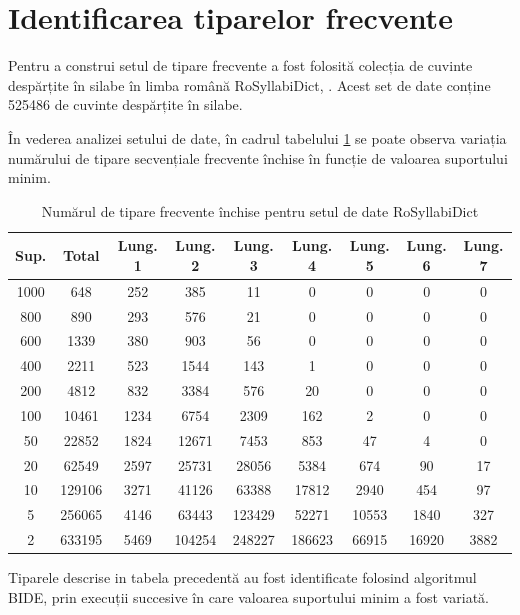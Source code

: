 \section{Identificarea tiparelor frecvente}

Pentru a construi setul de tipare frecvente a fost folosită colecția de cuvinte despărțite în silabe în limba română RoSyllabiDict, \cite{bib:BARBU08.495}. Acest set de date conține 525486 de cuvinte despărțite în silabe. 

În vederea analizei setului de date, în cadrul tabelului \ref{table:sdb_counts} se poate observa variația numărului de tipare secvențiale frecvente închise în funcție de valoarea suportului minim.   

\begin{table}[h!]
\centering
\begin{tabular}{|c|c|c|c|c|c|c|c|c|}
\hline
Sup.& Total & Lung. 1 & Lung. 2 & Lung. 3 & Lung. 4 & Lung. 5 & Lung. 6 & Lung. 7\\ 
\hline
\hline
1000 & 648 & 252 & 385 & 11 & 0 & 0 & 0 & 0\\ 
\hline
800 & 890 & 293 & 576 & 21 & 0 & 0 & 0 & 0\\ 
\hline
600 & 1339 & 380 & 903 & 56 & 0 & 0 & 0 & 0\\ 
\hline
400 & 2211 & 523 & 1544 & 143 & 1 & 0 & 0 & 0\\ 
\hline
200 & 4812 & 832 & 3384 & 576 & 20 & 0 & 0 & 0\\ 
\hline
100 & 10461 & 1234 & 6754 & 2309 & 162 & 2 & 0 & 0\\ 
\hline
50 & 22852 & 1824 & 12671 & 7453 & 853 & 47 & 4 & 0\\ 
\hline
20 & 62549 & 2597 & 25731 & 28056 & 5384 & 674 & 90 & 17\\ 
\hline
10 & 129106 & 3271 & 41126 & 63388 & 17812 & 2940 & 454 & 97\\ 
\hline
5 & 256065 & 4146 & 63443 & 123429 & 52271 & 10553 & 1840 & 327\\ 
\hline
2 & 633195 & 5469 & 104254 & 248227 & 186623 & 66915 & 16920 & 3882\\ 
\hline\end{tabular}
\label{table:sdb_counts}
\caption{Numărul de tipare frecvente închise pentru setul de date RoSyllabiDict} 
\end{table}

Tiparele descrise in tabela precedentă au fost identificate folosind algoritmul BIDE, prin execuții succesive în care valoarea suportului minim a fost variată.

